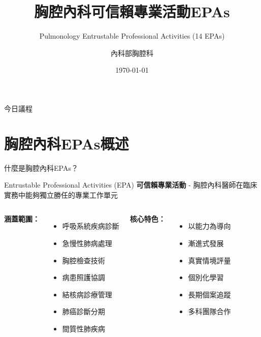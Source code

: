 \documentclass[aspectratio=169]{beamer}
\title{胸腔內科可信賴專業活動EPAs}
\subtitle{Pulmonology Entrustable Professional Activities (14 EPAs)}
\author{內科部胸腔科}
\date{\today}
\institute{醫學中心}
\begin{document}
\begin{frame}
\titlepage
\end{frame}

\begin{frame}{今日議程}
\tableofcontents
\end{frame}

\section{胸腔內科EPAs概述}

\begin{frame}{什麼是胸腔內科EPAs？}
\begin{block}{Entrustable Professional Activities (EPA)}
\textbf{可信賴專業活動} - 胸腔內科醫師在臨床實務中能夠獨立勝任的專業工作單元
\end{block}

\vspace{0.5cm}

\begin{columns}[c]
\textbf{涵蓋範圍：}
\begin{itemize}
\item 呼吸系統疾病診斷
\item 急慢性肺病處理
\item 胸腔檢查技術
\item 病患照護協調
\item \textcolor{emergency_red}{結核病診療管理}
\item \textcolor{emergency_red}{肺癌診斷分期}
\item \textcolor{emergency_red}{間質性肺疾病}
\end{itemize}

\textbf{核心特色：}
\begin{itemize}
\item 以能力為導向
\item 漸進式發展
\item 真實情境評量
\item 個別化學習
\item \textcolor{emergency_red}{長期個案追蹤}
\item \textcolor{emergency_red}{多科團隊合作}
\end{itemize}
\end{columns}
\end{frame}
\end{document}
